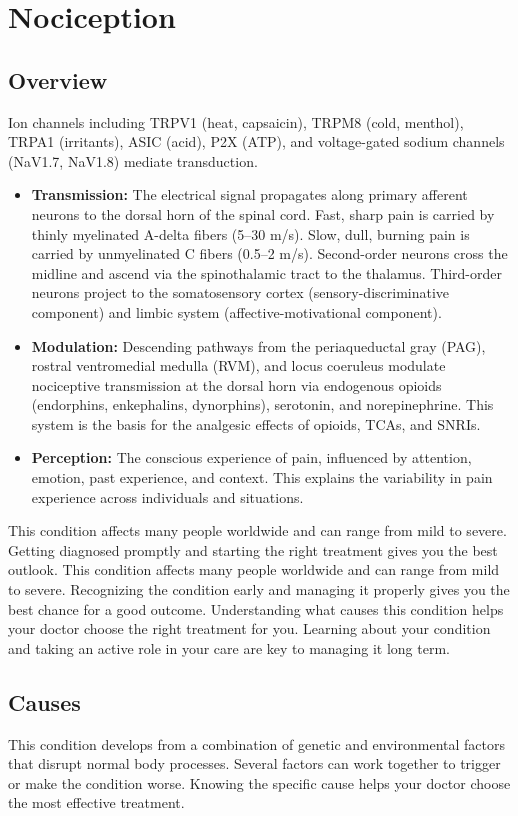 \chapter{Nociception}
\label{sec:Nociception}

\section{Overview}
Ion channels including TRPV1 (heat, capsaicin), TRPM8 (cold, menthol), TRPA1 (irritants), ASIC (acid), P2X (ATP), and voltage-gated sodium channels (NaV1.7, NaV1.8) mediate transduction.
\begin{itemize}[noitemsep]
  \item \textbf{Transmission:} The electrical signal propagates along primary afferent neurons to the dorsal horn of the spinal cord. Fast, sharp pain is carried by thinly myelinated A-delta fibers (5--30 m/s). Slow, dull, burning pain is carried by unmyelinated C fibers (0.5--2 m/s). Second-order neurons cross the midline and ascend via the spinothalamic tract to the thalamus. Third-order neurons project to the somatosensory cortex (sensory-discriminative component) and limbic system (affective-motivational component).
  \item \textbf{Modulation:} Descending pathways from the periaqueductal gray (PAG), rostral ventromedial medulla (RVM), and locus coeruleus modulate nociceptive transmission at the dorsal horn via endogenous opioids (endorphins, enkephalins, dynorphins), serotonin, and norepinephrine. This system is the basis for the analgesic effects of opioids, TCAs, and SNRIs.
  \item \textbf{Perception:} The conscious experience of pain, influenced by attention, emotion, past experience, and context. This explains the variability in pain experience across individuals and situations.
\end{itemize}
 This condition affects many people worldwide and can range from mild to severe. Getting diagnosed promptly and starting the right treatment gives you the best outlook. This condition affects many people worldwide and can range from mild to severe. Recognizing the condition early and managing it properly gives you the best chance for a good outcome. Understanding what causes this condition helps your doctor choose the right treatment for you. Learning about your condition and taking an active role in your care are key to managing it long term.

\section{Causes}
This condition develops from a combination of genetic and environmental factors that disrupt normal body processes. Several factors can work together to trigger or make the condition worse. Knowing the specific cause helps your doctor choose the most effective treatment.

